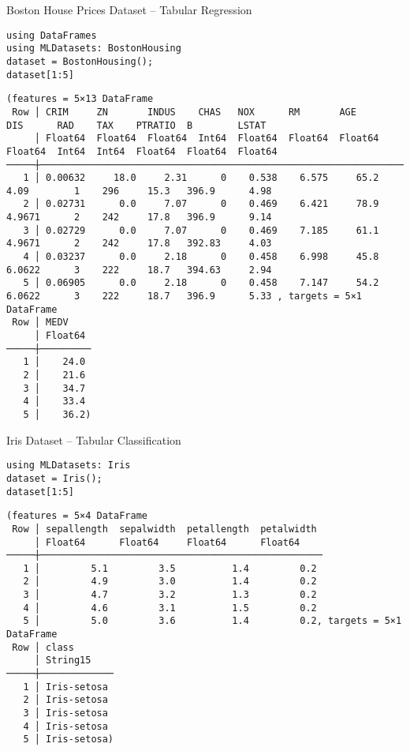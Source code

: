 \documentclass[10pt]{beamer}
\begin{document}
\begin{frame}[label={sec:org08272bf},fragile]{Boston House Prices Dataset -- Tabular Regression}
 \begin{verbatim}
using DataFrames
using MLDatasets: BostonHousing
dataset = BostonHousing();
dataset[1:5]
\end{verbatim}

\begin{verbatim}
(features = 5×13 DataFrame
 Row │ CRIM     ZN       INDUS    CHAS   NOX      RM       AGE      DIS      RAD    TAX    PTRATIO  B        LSTAT   
     │ Float64  Float64  Float64  Int64  Float64  Float64  Float64  Float64  Int64  Int64  Float64  Float64  Float64 
─────┼────────────────────────────────────────────────────────────────────────────────────────────────────────────────
   1 │ 0.00632     18.0     2.31      0    0.538    6.575     65.2   4.09        1    296     15.3   396.9      4.98 
   2 │ 0.02731      0.0     7.07      0    0.469    6.421     78.9   4.9671      2    242     17.8   396.9      9.14
   3 │ 0.02729      0.0     7.07      0    0.469    7.185     61.1   4.9671      2    242     17.8   392.83     4.03
   4 │ 0.03237      0.0     2.18      0    0.458    6.998     45.8   6.0622      3    222     18.7   394.63     2.94
   5 │ 0.06905      0.0     2.18      0    0.458    7.147     54.2   6.0622      3    222     18.7   396.9      5.33 , targets = 5×1 DataFrame
 Row │ MEDV
     │ Float64
─────┼─────────
   1 │    24.0
   2 │    21.6
   3 │    34.7
   4 │    33.4
   5 │    36.2)
\end{verbatim}
\end{frame}

\begin{frame}[label={sec:orgfc4eea1},fragile]{Iris Dataset -- Tabular Classification}
 \begin{verbatim}
using MLDatasets: Iris
dataset = Iris();
dataset[1:5]
\end{verbatim}

\begin{verbatim}
(features = 5×4 DataFrame
 Row │ sepallength  sepalwidth  petallength  petalwidth
     │ Float64      Float64     Float64      Float64
─────┼──────────────────────────────────────────────────
   1 │         5.1         3.5          1.4         0.2
   2 │         4.9         3.0          1.4         0.2
   3 │         4.7         3.2          1.3         0.2
   4 │         4.6         3.1          1.5         0.2
   5 │         5.0         3.6          1.4         0.2, targets = 5×1 DataFrame
 Row │ class
     │ String15
─────┼─────────────
   1 │ Iris-setosa
   2 │ Iris-setosa
   3 │ Iris-setosa
   4 │ Iris-setosa
   5 │ Iris-setosa)
\end{verbatim}
\end{frame}
\end{document}
